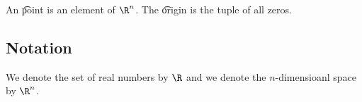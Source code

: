
\sbasic
























\sstart
{}



An \t{point} is an element of $\R^n$.
The \t{origin} is the tuple of all zeros.

\subsection{Notation}

We denote the set of real
numbers by $\R$ and we denote
the $n$-dimensioanl space by $\R^n$.
\strats
